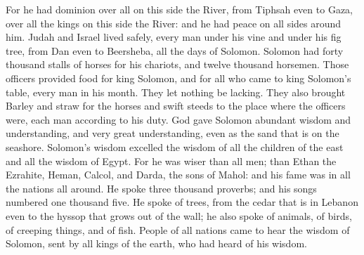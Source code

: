 {For he had dominion over all on this side the River, from Tiphsah even to Gaza, over all the kings on this side the River: and he had peace on all sides around him.
Judah and Israel lived safely, every man under his vine and under his fig tree, from Dan even to Beersheba, all the days of Solomon.
Solomon had forty thousand stalls of horses for his chariots, and twelve thousand horsemen.
Those officers provided food for king Solomon, and for all who came to king Solomon’s table, every man in his month. They let nothing be lacking.
They also brought Barley and straw for the horses and swift steeds to the place where the officers were, each man according to his duty.
God gave Solomon abundant wisdom and understanding, and very great understanding, even as the sand that is on the seashore.
Solomon’s wisdom excelled the wisdom of all the children of the east and all the wisdom of Egypt.
For he was wiser than all men; than Ethan the Ezrahite, Heman, Calcol, and Darda, the sons of Mahol: and his fame was in all the nations all around.
He spoke three thousand proverbs; and his songs numbered one thousand five.
He spoke of trees, from the cedar that is in Lebanon even to the hyssop that grows out of the wall; he also spoke of animals, of birds, of creeping things, and of fish.
People of all nations came to hear the wisdom of Solomon, sent by all kings of the earth, who had heard of his wisdom.

}
